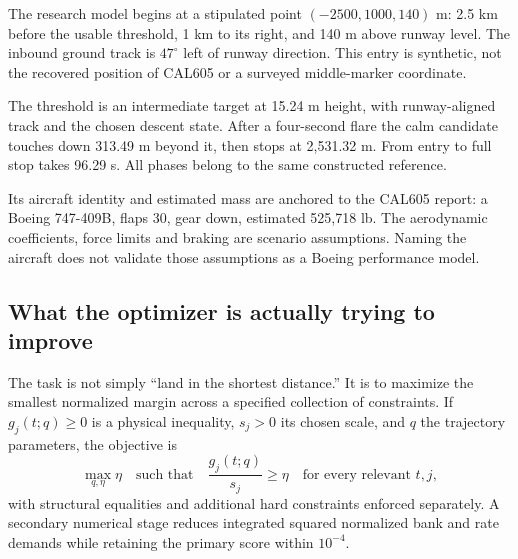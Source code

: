 \label{part:4}
The research model begins at a stipulated point $(-2500,1000,140)$ m: 2.5 km before the usable threshold, 1 km to its right, and 140 m above runway level. The inbound ground track is $47^\circ$ left of runway direction. This entry is synthetic, not the recovered position of CAL605 or a surveyed middle-marker coordinate.


The threshold is an intermediate target at 15.24 m height, with runway-aligned track and the chosen descent state. After a four-second flare the calm candidate touches down 313.49 m beyond it, then stops at 2,531.32 m. From entry to full stop takes 96.29 s. All phases belong to the same constructed reference.

Its aircraft identity and estimated mass are anchored to the CAL605 report: a Boeing 747-409B, flaps 30, gear down, estimated 525,718 lb. The aerodynamic coefficients, force limits and braking are scenario assumptions. Naming the aircraft does not validate those assumptions as a Boeing performance model.
\par\medskip
\subsection*{What the optimizer is actually trying to improve}
The task is not simply ``land in the shortest distance.'' It is to maximize the smallest normalized margin across a specified collection of constraints. If $g_j(t;q)\geq0$ is a physical inequality, $s_j>0$ its chosen scale, and $q$ the trajectory parameters, the objective is
\begin{equation}
\max_{q,\eta}\eta\quad\text{such that}\quad
\frac{g_j(t;q)}{s_j}\geq\eta\quad\text{for every relevant }t,j,
\label{eq:objective}
\end{equation}
with structural equalities and additional hard constraints enforced separately. A secondary numerical stage reduces integrated squared normalized bank and rate demands while retaining the primary score within $10^{-4}$.

